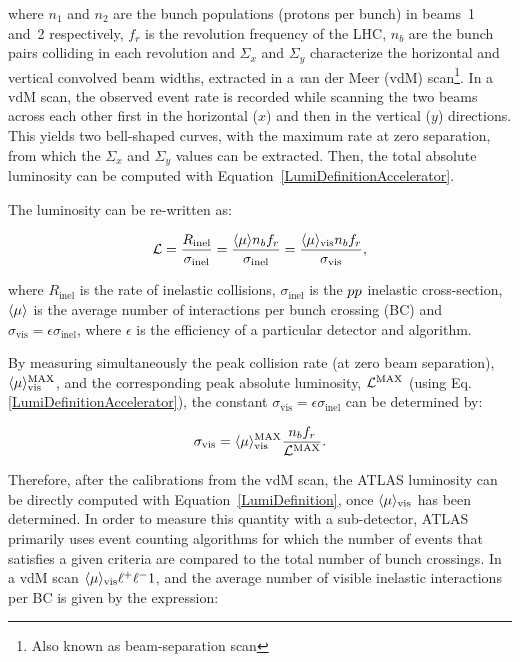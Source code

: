 \noindent where $n_{1}$ and $n_{2}$ are the bunch populations (protons per bunch) in beams~1 and~2 respectively, $f_{r}$ is the revolution frequency of the LHC, $n_{b}$ are the bunch pairs colliding in each revolution and $\Sigma_{x}$ and $\Sigma_{y}$ characterize the horizontal and vertical convolved beam widths, extracted in a {\emph van der Meer} (vdM) scan\footnote{Also known as beam-separation scan}.
In a vdM scan, the observed event rate is recorded while scanning the two beams across each other first in the horizontal ($x$) and then in the vertical ($y$) directions. This yields two bell-shaped curves, with the maximum rate at zero separation, from which the $\Sigma_{x}$ and $\Sigma_{y}$ values can be extracted.
Then, the total absolute luminosity can be computed with Equation~\ref{LumiDefinitionAccelerator}.

The luminosity can be re-written as:

\begin{equation}
  \mathcal{L} = \frac{R_{\text{inel}}}{\sigma_{\text{inel}}} = 
  \frac{\langle\mu\rangle n_b f_r}{\sigma_{\text{inel}}} = 
  \frac{\langle\mu\rangle_{\text{vis}} n_b f_r}{\sigma_{\text{vis}}}, 
  \label{LumiDefinition}
\end{equation}

\noindent where $R_{\text{inel}}$ is the rate of inelastic collisions, $\sigma_{\text{inel}}$ is the $pp$ inelastic cross-section, $\langle\mu\rangle$ is the average number of interactions per bunch crossing (BC) and $\sigma_{\text{vis}} = \epsilon\sigma_{\text{inel}}$, where $\epsilon$ is the efficiency of a particular detector and algorithm.

By measuring simultaneously the peak collision rate (at zero beam separation), $\langle\mu\rangle_{\text{vis}}^{\text{MAX}}$, and the corresponding peak absolute luminosity, $\mathcal{L}^{\text{MAX}}$ (using Eq. \ref{LumiDefinitionAccelerator}), the constant $\sigma_{\text{vis}} = \epsilon\sigma_{\text{inel}}$ can be determined by:

\begin{equation}
  \sigma_{\text{vis}} = \langle\mu\rangle_{\text{vis}}^{\text{MAX}} \frac{n_{b} f_{r}}{\mathcal{L}^{\text{MAX}}}.
  \label{LumiVisibleXSection}
\end{equation}

Therefore, after the calibrations from the vdM scan, the ATLAS luminosity can be directly computed with Equation~\ref{LumiDefinition}, once $\langle\mu\rangle_{\text{vis}}$ has been determined.
In order to measure this quantity with a sub-detector, ATLAS primarily uses event counting algorithms for which the number of events that satisfies a given criteria are compared to the total number of bunch crossings.
In a vdM scan $\averageIntXing_{\text{vis}} \muchless 1$, and the average number of visible inelastic interactions per BC is given by the expression:

